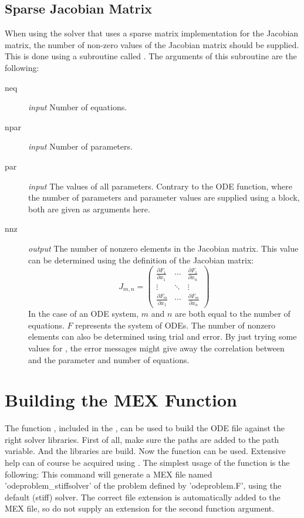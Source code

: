 \subsection{Sparse Jacobian Matrix}
When using the solver that uses a sparse matrix implementation for the Jacobian matrix, the number of non-zero values of the Jacobian matrix should be supplied. This is done using a \Fortran subroutine called . The arguments of this subroutine are the following:
\begin{description}
 \item[neq] \emph{input} Number of equations.
 \item[npar] \emph{input} Number of parameters.
 \item[par] \emph{input} The values of all parameters. Contrary to the ODE function, where the number of parameters and parameter values are supplied using a  block, both are given as arguments here.
 \item[nnz] \emph{output} The number of nonzero elements in the Jacobian matrix. This value can be determined using the definition of the Jacobian matrix:
 \begin{equation}
  J_{m,n} =
  \begin{pmatrix}
   \frac{\partial F_1}{\partial x_1} & \cdots & \frac{\partial F_1}{\partial x_n} \\
   \vdots & \ddots & \vdots  \\
   \frac{\partial F_m}{\partial x_1} & \cdots & \frac{\partial F_m}{\partial x_n}
  \end{pmatrix}
 \end{equation}
 In the case of an ODE system, $m$ and $n$ are both equal to the number of equations. $F$ represents the system of ODEs.
 The number of nonzero elements can also be determined using trial and error. By just trying some values for , the error messages might give away the correlation between  and the parameter and number of equations.
\end{description}

\section[Building]{Building the MEX Function}
The \MATLAB function , included in the \PPODESUITE, can be used to build the ODE \Fortran file against the right solver libraries. First of all, make sure the \PPODESUITE paths are added to the \MATLAB path variable.
And the libraries are build.
Now the function  can be used. Extensive help can of course be acquired using . The simplest usage of the function is the following:
This command will generate a MEX file named 'odeproblem\_stiffsolver' of the problem defined by 'odeproblem.F', using the default (stiff) solver. The correct file extension is automatically added to the MEX file, so do not supply an extension for the second function argument.

